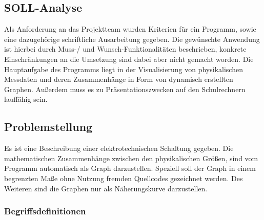 \documentclass{article}
\begin{document}
\subsection{SOLL-Analyse}

    Als Anforderung an das Projektteam wurden Kriterien für ein Programm, sowie eine dazugehörige schriftliche Ausarbeitung gegeben.
    Die gewünschte Anwendung ist hierbei durch Muss-/ und Wunsch-Funktionalitäten beschrieben, konkrete Einschränkungen an die Umsetzung sind dabei aber nicht gemacht worden.
    Die Hauptaufgabe des Programms liegt in der Visualisierung von physikalischen Messdaten und deren Zusammenhänge in Form von dynamisch erstellten Graphen.
    Außerdem muss es zu Präsentationszwecken auf den Schulrechnern lauffähig sein.

\subsection{Problemstellung}

    Es ist eine Beschreibung einer elektrotechnischen Schaltung gegeben. Die mathematischen Zusammenhänge zwischen den physikalischen Größen, sind vom Programm automatisch als Graph darzustellen. Speziell soll der Graph in einem begrenzten Maße ohne Nutzung fremden Quellcodes gezeichnet werden. Des Weiteren sind die Graphen nur als Näherungskurve darzustellen.

    \subsubsection{Begriffsdefinitionen}
\end{document}
